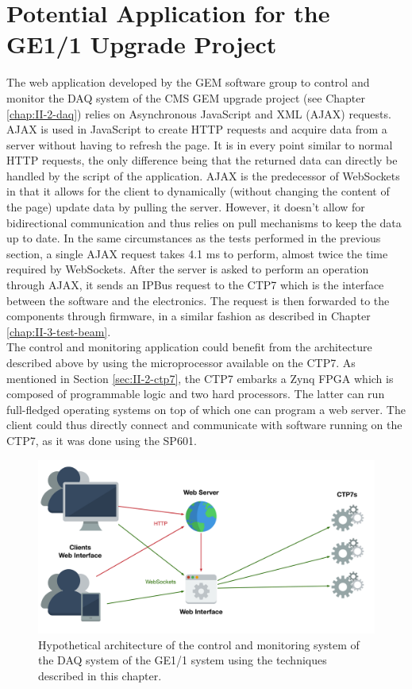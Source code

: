   \section{Potential Application for the GE1/1 Upgrade Project}

    The web application developed by the GEM software group to control and monitor the DAQ system of the CMS GEM upgrade project (see Chapter \ref{chap:II-2-daq}) relies on Asynchronous JavaScript and XML (AJAX) requests. AJAX is used in JavaScript to create HTTP requests and acquire data from a server without having to refresh the page. It is in every point similar to normal HTTP requests, the only difference being that the returned data can directly be handled by the script of the application. AJAX is the predecessor of WebSockets in that it allows for the client to dynamically (without changing the content of the page) update data by pulling the server. However, it doesn't allow for bidirectional communication and thus relies on pull mechanisms to keep the data up to date. In the same circumstances as the tests performed in the previous section, a single AJAX request takes 4.1 ms to perform, almost twice the time required by WebSockets. After the server is asked to perform an operation through AJAX, it sends an IPBus request to the CTP7 which is the interface between the software and the electronics. The request is then forwarded to the components through firmware, in a similar fashion as described in Chapter \ref{chap:II-3-test-beam}. \\

    The control and monitoring application could benefit from the architecture described above by using the microprocessor available on the CTP7. As mentioned in Section \ref{sec:II-2-ctp7}, the CTP7 embarks a Zynq FPGA which is composed of programmable logic and two hard processors. The latter can run full-fledged operating systems on top of which one can program a web server. The client could thus directly connect and communicate with software running on the CTP7, as it was done using the SP601. \\

    \begin{figure}[b!]
      \centering
      \includegraphics[width=\textwidth]{img/III-2-web-daq/gem-sys}
      \caption{Hypothetical architecture of the control and monitoring system of the DAQ system of the GE1/1 system using the techniques described in this chapter.}
      \label{fig:III-2-gem}
    \end{figure}


